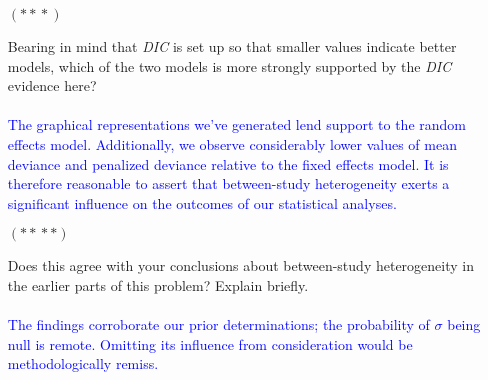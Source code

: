 \documentclass[12pt]{article}
\begin{document}
\begin{itemize}
\begin{itemize}
\begin{itemize}
\item[$( * \! * \! * )$]

Bearing in mind that \textit{DIC} is set up so that smaller values indicate better models, which of the two models is more strongly supported by the \textit{DIC} evidence here? \textit{\fbox{\textbf{[10 points]}}}
\\ \\
\textcolor{blue}{The graphical representations we've generated lend support to the random effects model. Additionally, we observe considerably lower values of mean deviance and penalized deviance relative to the fixed effects model. It is therefore reasonable to assert that between-study heterogeneity exerts a significant influence on the outcomes of our statistical analyses.}

\item[$( * \! * \! * * )$]

Does this agree with your conclusions about between-study heterogeneity in the earlier parts of this problem? Explain briefly. \textit{\fbox{\textbf{[10 points]}}}
\\ \\
\textcolor{blue}{The findings corroborate our prior determinations; the probability of \(\sigma\) being null is remote. Omitting its influence from consideration would be methodologically remiss.
}
\end{itemize}

\end{itemize}

\end{itemize}
\end{document}
